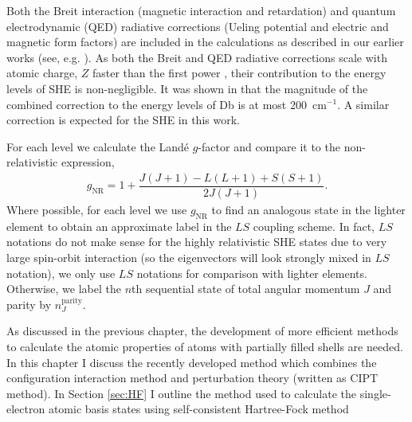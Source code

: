 \documentclass[10pt,a4paper, twoside, openright]{report}
\begin{document}
Both the Breit interaction (magnetic interaction and retardation)\cite{Breit1929, Mann1971}  and quantum electrodynamic (QED) radiative corrections  (Ueling potential and electric and magnetic form factors) \cite{FG2005} are included in the calculations as described in our earlier works (see, e.g. \cite{FF113-115}).  As both the Breit and QED radiative corrections scale with atomic charge, $Z$ faster than the first power \cite{FF113-115}, their contribution to the energy levels of SHE is non-negligible. It was shown in \cite{LDFDb2018} that the magnitude of the combined correction to the energy levels of Db is at most  200~cm$^{-1}$.  A similar correction is expected for the SHE in this work.

For each level we calculate the Land\'{e} $g$-factor and compare it to the non-relativistic expression,
\begin{align} \label{eq:Lande}
g_{\text{NR}} =  1 + \dfrac{J(J + 1) - L(L+1) + S(S+1)}{2J(J+1)}.
\end{align}
Where possible, for each level we use $g_{\text{NR}}$ to find an analogous state in the lighter element to obtain an approximate label in the $LS$ coupling scheme. In fact, $LS$ notations do not make sense for the highly relativistic SHE states due to very large spin-orbit interaction (so the eigenvectors will look strongly mixed in $LS$ notation), we only use $LS$ notations for comparison with lighter elements. Otherwise, we label the $n$th sequential state of total angular momentum $J$ and parity by $n_{J}^{\text{parity}}$.




As discussed in the previous chapter, the development of more efficient methods to calculate the atomic properties of atoms with partially filled shells are needed. In this chapter I discuss the recently developed method which combines the configuration interaction method and perturbation theory (written as CIPT method). In Section \ref{sec:HF} I outline the method used to calculate the single-electron atomic basis states using self-consistent Hartree-Fock method
\end{document}
